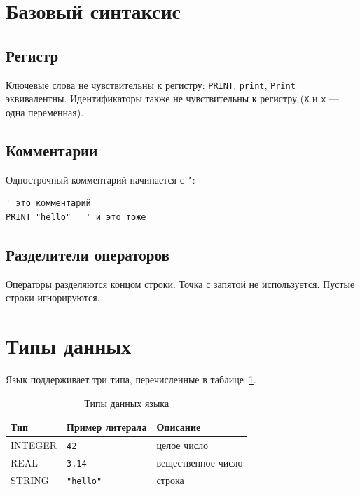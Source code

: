 \documentclass[14pt,a4paper]{article}
\begin{document}
\section{Базовый синтаксис}

\subsection{Регистр}

Ключевые слова не чувствительны к регистру: \texttt{PRINT},
\texttt{print}, \texttt{Print} эквивалентны. Идентификаторы также
не чувствительны к регистру (\texttt{X} и \texttt{x} — одна
переменная).

\subsection{Комментарии}

Однострочный комментарий начинается с \texttt{'}:
\begin{lstlisting}[language={},numbers=none]
' это комментарий
PRINT "hello"   ' и это тоже
\end{lstlisting}

\subsection{Разделители операторов}

Операторы разделяются концом строки. Точка с запятой не используется.
Пустые строки игнорируются.

\section{Типы данных}

Язык поддерживает три типа, перечисленные в таблице~\ref{tab:types}.

\begin{table}[H]
\caption{Типы данных языка}
\label{tab:types}
\centering
\begin{tabular}{@{}lll@{}}
\toprule
Тип & Пример литерала & Описание \\
\midrule
INTEGER & \texttt{42}      & целое число \\
REAL    & \texttt{3.14}    & вещественное число \\
STRING  & \texttt{"hello"} & строка \\
\bottomrule
\end{tabular}
\end{table}
\end{document}
